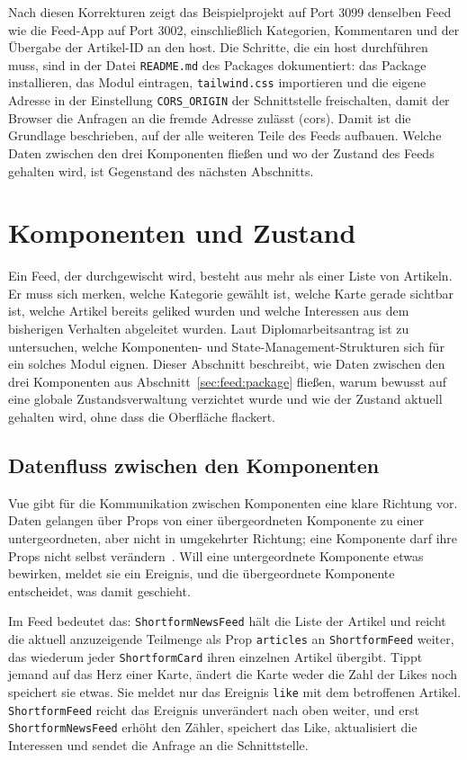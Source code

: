 Nach diesen Korrekturen zeigt das Beispielprojekt auf Port 3099 denselben Feed wie die Feed-App auf Port 3002, einschließlich Kategorien, Kommentaren und der Übergabe der Artikel-ID an den \gls{host}.
Die Schritte, die ein \gls{host} durchführen muss, sind in der Datei \texttt{README.md} des Packages dokumentiert: das Package installieren, das Modul eintragen, \texttt{tailwind.css} importieren und die eigene Adresse in der Einstellung \texttt{CORS\_ORIGIN} der Schnittstelle freischalten, damit der Browser die Anfragen an die fremde Adresse zulässt (\gls{cors}).
Damit ist die Grundlage beschrieben, auf der alle weiteren Teile des Feeds aufbauen.
Welche Daten zwischen den drei Komponenten fließen und wo der Zustand des Feeds gehalten wird, ist Gegenstand des nächsten Abschnitts.

\section{Komponenten und Zustand}\label{sec:feed:state}
\setauthor{\secondauthor}

Ein Feed, der durchgewischt wird, besteht aus mehr als einer Liste von Artikeln.
Er muss sich merken, welche Kategorie gewählt ist, welche Karte gerade sichtbar ist, welche Artikel bereits geliked wurden und welche Interessen aus dem bisherigen Verhalten abgeleitet wurden.
Laut Diplomarbeitsantrag ist zu untersuchen, welche Komponenten- und State-Management-Strukturen sich für ein solches Modul eignen.
Dieser Abschnitt beschreibt, wie Daten zwischen den drei Komponenten aus Abschnitt~\ref{sec:feed:package} fließen, warum bewusst auf eine globale Zustandsverwaltung verzichtet wurde und wie der Zustand aktuell gehalten wird, ohne dass die Oberfläche flackert.

\subsection{Datenfluss zwischen den Komponenten}

Vue gibt für die Kommunikation zwischen Komponenten eine klare Richtung vor.
Daten gelangen über Props von einer übergeordneten Komponente zu einer untergeordneten, aber nicht in umgekehrter Richtung; eine Komponente darf ihre Props nicht selbst verändern~\cite{vueprops}.
Will eine untergeordnete Komponente etwas bewirken, meldet sie ein Ereignis, und die übergeordnete Komponente entscheidet, was damit geschieht.

Im Feed bedeutet das: \texttt{ShortformNewsFeed} hält die Liste der Artikel und reicht die aktuell anzuzeigende Teilmenge als Prop \texttt{articles} an \texttt{ShortformFeed} weiter, das wiederum jeder \texttt{ShortformCard} ihren einzelnen Artikel übergibt.
Tippt jemand auf das Herz einer Karte, ändert die Karte weder die Zahl der Likes noch speichert sie etwas.
Sie meldet nur das Ereignis \texttt{like} mit dem betroffenen Artikel.
\texttt{ShortformFeed} reicht das Ereignis unverändert nach oben weiter, und erst \texttt{ShortformNewsFeed} erhöht den Zähler, speichert das Like, aktualisiert die Interessen und sendet die Anfrage an die Schnittstelle.


